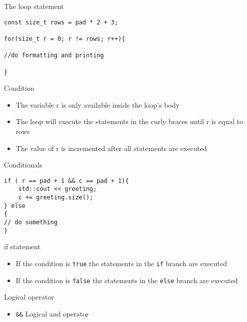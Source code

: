 \documentclass[12pt]{beamer}
\begin{document}
\begin{frame}[fragile]{The loop statement}
\begin{lstlisting}
const size_t rows = pad * 2 + 3;

for(size_t r = 0; r != rows; r++){

//do formatting and printing

}
\end{lstlisting}
\begin{block}{Condition}
\begin{itemize}
\item The variable r is only available inside the loop's body
\item The loop will execute the statements in the curly braces until r is equal to rows
\item The value of r is incremented after all statements are executed
\end{itemize}
\end{block}


\end{frame}


\begin{frame}[fragile]{Conditionals}
\begin{lstlisting}
if ( r == pad + 1 && c == pad + 1){
	std::cout << greeting;
    c += greeting.size();
} else
{
// do something
}
\end{lstlisting}
\begin{block}{if statement}
\begin{itemize}
\item If the condition is \lstinline|true| the statements in the \lstinline|if| branch are executed
\item If the condition is \lstinline|false| the statements in the \lstinline|else| branch are executed
\end{itemize}
\end{block}
\begin{block}{Logical operator}
\begin{itemize}
\item \lstinline|&&| Logical and operator
\end{itemize}
\end{block}
\end{frame}
\end{document}
